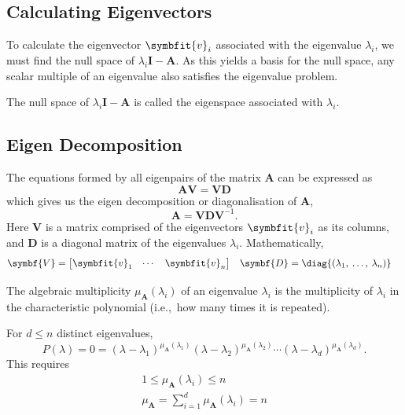 \documentclass{article}
\begin{document}
\subsection{Calculating Eigenvectors}
To calculate the eigenvector \(\symbfit{v}_i\) associated with the eigenvalue \(\lambda_i\), we must find the null space
of \(\lambda_i \symbf{I} - \symbf{A}\). As this yields a basis for the null space, any scalar multiple of an eigenvalue also
satisfies the eigenvalue problem.
\begin{definition}[Eigenspace]
    The null space of \(\lambda_i \symbf{I} - \symbf{A}\) is called the eigenspace associated with \(\lambda_i\).
\end{definition}
\subsection{Eigen Decomposition}
The equations formed by all eigenpairs of the matrix \(\symbf{A}\) can be expressed as
\begin{equation*}
    \symbf{A} \symbf{V} = \symbf{V} \symbf{D}
\end{equation*}
which gives us the eigen decomposition or diagonalisation of \(\symbf{A}\),
\begin{equation*}
    \symbf{A} = \symbf{V} \symbf{D} \symbf{V}^{-1}.
\end{equation*}
Here \(\symbf{V}\) is a matrix comprised of the eigenvectors \(\symbfit{v}_i\) as its columns, and \(\symbf{D}\) is a
diagonal matrix of the eigenvalues \(\lambda_i\). Mathematically,
\begin{align*}
    \symbf{V} & = \begin{bmatrix}
                      \symbfit{v}_1 & \cdots & \symbfit{v}_n
                  \end{bmatrix}
              & \symbf{D}                               & = \diag{\left( \lambda_1,\: \dots,\: \lambda_n \right)}
\end{align*}
\begin{definition}
    The algebraic multiplicity \(\mu_{\symbf{A}}\left( \lambda_i \right)\)
    of an eigenvalue \(\lambda_i\) is
    the multiplicity of \(\lambda_i\) in the characteristic polynomial
    (i.e.,\ how many times it is repeated).

    For \(d \leq n\) distinct eigenvalues,
    \begin{equation*}
        P\left( \lambda \right) = 0 = \left( \lambda - \lambda_1 \right)^{\mu_{\symbf{A}}\left( \lambda_1 \right)} \left( \lambda - \lambda_2 \right)^{\mu_{\symbf{A}}\left( \lambda_2 \right)} \cdots \left( \lambda - \lambda_d \right)^{\mu_{\symbf{A}}\left( \lambda_d \right)}.
    \end{equation*}
    This requires
    \begin{gather*}
        1 \leq \mu_{\symbf{A}}\left( \lambda_i \right) \leq n         \\
        \mu_{\symbf{A}} = \sum_{i = 1}^d \mu_{\symbf{A}} \left( \lambda_i \right) = n
    \end{gather*}
\end{definition}
\end{document}
